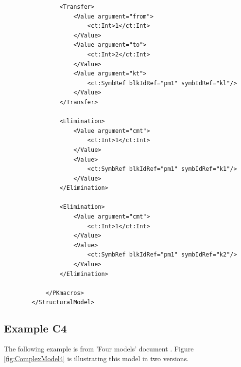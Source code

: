 \begin{lstlisting}
                <Transfer>
                    <Value argument="from">
                        <ct:Int>1</ct:Int>
                    </Value>
                    <Value argument="to">
                        <ct:Int>2</ct:Int>
                    </Value>
                    <Value argument="kt">
                        <ct:SymbRef blkIdRef="pm1" symbIdRef="kl"/>
                    </Value>
                </Transfer>
                
                <Elimination>
                    <Value argument="cmt">
                        <ct:Int>1</ct:Int>
                    </Value>
                    <Value>
                        <ct:SymbRef blkIdRef="pm1" symbIdRef="k1"/>
                    </Value>
                </Elimination>
                
                <Elimination>
                    <Value argument="cmt">
                        <ct:Int>1</ct:Int>
                    </Value>
                    <Value>
                        <ct:SymbRef blkIdRef="pm1" symbIdRef="k2"/>
                    </Value>
                </Elimination>
                
            </PKmacros>
        </StructuralModel>
\end{lstlisting}


\subsection{Example C4}
The following example is from 'Four models' document \cite{LavielleFourModels:2014}.
Figure \ref{fig:ComplexModel4} is illustrating this model in two versions. 

